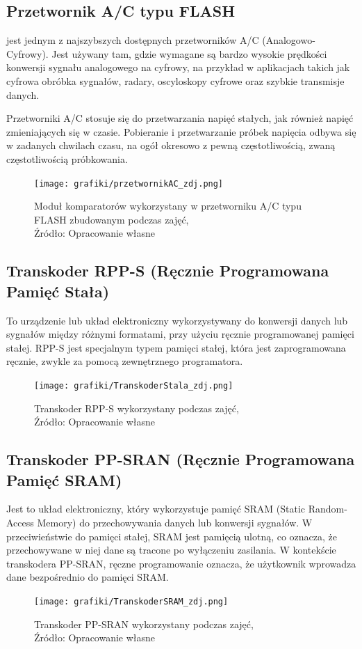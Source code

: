 \documentclass{article}
\begin{document}
    \subsection{Przetwornik A/C typu FLASH}
    jest jednym z najszybszych dostępnych przetworników A/C (Analogowo-Cyfrowy). Jest używany tam, gdzie wymagane są bardzo wysokie prędkości konwersji sygnału analogowego na cyfrowy, na przykład w aplikacjach takich jak cyfrowa obróbka sygnałów, radary, oscyloskopy cyfrowe oraz szybkie transmisje danych.


    Przetworniki A/C stosuje się do przetwarzania napięć stałych, jak również napięć
    zmieniających się w czasie. Pobieranie i przetwarzanie próbek napięcia odbywa się w zadanych chwilach czasu, na ogół okresowo z pewną częstotliwością, zwaną częstotliwością próbkowania. 
    \begin{figure}[!ht]
      \centering
      \texttt{[image: grafiki/przetwornikAC\_zdj.png]}
      \caption{Moduł komparatorów wykorzystany w przetworniku A/C typu FLASH zbudowanym podczas zajęć,
      \\Źródło: Opracowanie własne}
      \label{fig1:komparator}
    \end{figure}
    \pagebreak

    \subsection{Transkoder RPP-S (Ręcznie Programowana Pamięć Stała)}
      To urządzenie lub układ elektroniczny wykorzystywany do konwersji danych lub sygnałów między różnymi formatami, przy użyciu ręcznie programowanej pamięci stałej. RPP-S jest specjalnym typem pamięci stałej, która jest zaprogramowana ręcznie, zwykle za pomocą zewnętrznego programatora.
      \begin{figure}[!ht]
        \centering
        \texttt{[image: grafiki/TranskoderStala\_zdj.png]}
        \caption{Transkoder RPP-S wykorzystany podczas zajęć,
        \\Źródło: Opracowanie własne}
      \end{figure}

    \subsection{Transkoder PP-SRAN (Ręcznie Programowana Pamięć SRAM)}
      Jest to układ elektroniczny, który wykorzystuje pamięć SRAM (Static Random-Access Memory) do przechowywania danych lub konwersji sygnałów. W przeciwieństwie do pamięci stałej, SRAM jest pamięcią ulotną, co oznacza, że przechowywane w niej dane są tracone po wyłączeniu zasilania. W kontekście transkodera PP-SRAN, ręczne programowanie oznacza, że użytkownik wprowadza dane bezpośrednio do pamięci SRAM.
      \begin{figure}[!ht]
        \centering
        \texttt{[image: grafiki/TranskoderSRAM\_zdj.png]}
        \caption{Transkoder PP-SRAN wykorzystany podczas zajęć,
        \\Źródło: Opracowanie własne}
      \end{figure}
\end{document}
